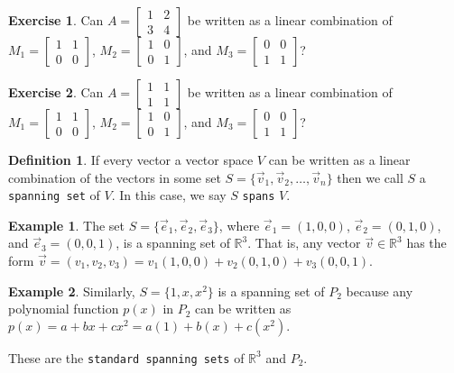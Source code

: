 \documentclass{beamer}
\newcommand{\R}{\mathbb{R}}
\newcommand{\fn}{\insertframenumber}
\theoremstyle{definition}
\newtheorem{exercise}{Exercise}
\newtheorem*{defn}{Definition}
\newtheorem*{exa}{Example}
\renewcommand{\emph}[1]{{\color{blue}\texttt{#1}}}
\begin{document}
\begin{frame}{\fn}
	\begin{exercise}
		Can $A = \begin{bmatrix}1&2\\3&4\end{bmatrix}$ be written as a linear combination of $M_1=\begin{bmatrix}1&1\\0&0\end{bmatrix}$, $M_2=\begin{bmatrix}1&0\\0&1\end{bmatrix}$, and $M_3=\begin{bmatrix}0&0\\1&1\end{bmatrix}$?
	\end{exercise}
	\begin{exercise}
		Can $A = \begin{bmatrix}1&1\\1&1\end{bmatrix}$ be written as a linear combination of $M_1=\begin{bmatrix}1&1\\0&0\end{bmatrix}$, $M_2=\begin{bmatrix}1&0\\0&1\end{bmatrix}$, and $M_3=\begin{bmatrix}0&0\\1&1\end{bmatrix}$?
	\end{exercise}
\end{frame}
\begin{frame}{\fn}
	\begin{defn}
		If every vector a vector space $V$ can be written as a linear combination of the vectors in some set $S=\{\vec v_1,\vec v_2,\dots,\vec v_n\}$ then we call $S$ a \emph{spanning set} of $V$.
		In this case, we say $S$ \emph{spans} $V$.
	\end{defn}
	\begin{exa}
		The set $S=\{\vec e_1,\vec e_2,\vec e_3\}$, where $\vec e_1=(1,0,0)$, $\vec e_2=(0,1,0)$, and $\vec e_3=(0,0,1)$, is a spanning set of $\R^3$.  That is, any vector $\vec v\in \R^3$ has the form $\vec v=(v_1,v_2,v_3)=v_1(1,0,0)+v_2(0,1,0)+v_3(0,0,1)$.
	\end{exa}\begin{exa} 	
		Similarly, $S=\{1,x,x^2\}$ is a spanning set of $P_2$ because any polynomial function $p(x)$ in $P_2$ can be written as $p(x)=a+bx+cx^2 =a(1)+b(x)+c(x^2).$
	\end{exa}
		These are the \emph{standard spanning sets} of $\R^3$ and $P_2$.
\end{frame}
\end{document}
